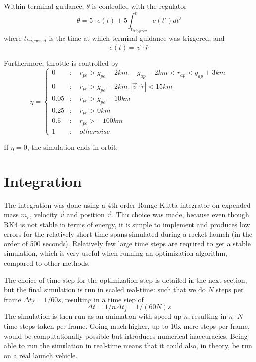 \documentclass[11pt]{article}
\begin{document}
Within terminal guidance, $\theta$ is controlled with the regulator 
$$
\theta = 5 \cdot e(t) + 5 \int_{t_{triggered}}^t e(t') dt'
$$
where $t_{triggered}$ is the time at which terminal guidance was triggered, and
$$
e(t) = \vec{v} \cdot \hat{r}
$$

Furthermore, throttle is controlled by
$$
\eta = \begin{cases}
0 & : \quad r_{pe} > g_{pe} - 2 km, \quad g_{ap} - 2 km < r_{ap} < g_{ap} + 3 km \\
0 & : \quad r_{pe} > g_{pe} - 2 km, \left| \vec{v} \cdot \hat{r} \right| < 15 km \\
0.05 & : \quad r_{pe} > g_{pe} - 10 km \\
0.25 & : \quad r_{pe} > 0 km \\
0.5 & : \quad r_{pe} > -100 km \\
1 & :  \quad otherwise
\end{cases}
$$

If $\eta = 0$, the simulation ends in orbit.

\section{Integration}
The integration was done using a 4th order Runge-Kutta integrator on expended mass $m_e$, velocity $\vec{v}$ and position $\vec{r}$. 
This choice was made, because even though RK4 is not stable in terms of energy, it is simple to implement and produces low errors for the relatively short time spans simulated during a rocket launch (in the order of 500 seconds).
Relatively few large time steps are required to get a stable simulation, which is very useful when running an optimization algorithm, compared to other methods.

The choice of time step for the optimization step is detailed in the next section, but the final simulation is run in scaled real-time: such that we do $N$ steps per frame $\Delta t_f = 1/60 s$, resulting
in a time step of 
$$
\Delta t = 1/n \Delta  t_f = 1/(60N) s
$$ 
The simulation is then run as an animation with speed-up $n$, resulting in $n \cdot N$ time steps taken per frame. 
Going much higher, up to 10x more steps per frame, would be computationally possible but introduces
numerical inaccuracies. Being able to run the simulation in real-time means that it could also, in theory, be run on a real launch vehicle.
\end{document}
